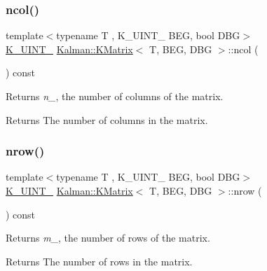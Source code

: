 \subsubsection{\texorpdfstring{ncol()}{ncol()}}
{\footnotesize\ttfamily template$<$typename T , K\+\_\+\+U\+I\+N\+T\+\_ B\+EG, bool D\+BG$>$ \\
\mbox{\hyperlink{namespaceKalman_a628a50cae10f6e2035393d4f96c698bd}{K\+\_\+\+U\+I\+N\+T\+\_}} \mbox{\hyperlink{classKalman_1_1KMatrix}{Kalman\+::\+K\+Matrix}}$<$ T, B\+EG, D\+BG $>$\+::ncol (\begin{DoxyParamCaption}{ }\end{DoxyParamCaption}) const\hspace{0.3cm}{\ttfamily [inline]}}



Returns {\itshape n\+\_\+}, the number of columns of the matrix. 

\begin{DoxyReturn}{Returns}
The number of columns in the matrix. 
\end{DoxyReturn}
\mbox{\label{classKalman_1_1KMatrix_a2edc23298da61cfcc3e391826b1c941b}} 
\subsubsection{\texorpdfstring{nrow()}{nrow()}}
{\footnotesize\ttfamily template$<$typename T , K\+\_\+\+U\+I\+N\+T\+\_ B\+EG, bool D\+BG$>$ \\
\mbox{\hyperlink{namespaceKalman_a628a50cae10f6e2035393d4f96c698bd}{K\+\_\+\+U\+I\+N\+T\+\_}} \mbox{\hyperlink{classKalman_1_1KMatrix}{Kalman\+::\+K\+Matrix}}$<$ T, B\+EG, D\+BG $>$\+::nrow (\begin{DoxyParamCaption}{ }\end{DoxyParamCaption}) const\hspace{0.3cm}{\ttfamily [inline]}}



Returns {\itshape m\+\_\+}, the number of rows of the matrix. 

\begin{DoxyReturn}{Returns}
The number of rows in the matrix. 
\end{DoxyReturn}
\mbox{\label{classKalman_1_1KMatrix_a2174d21ab2ffb5c11b28d05ebb7ecb16}} 
